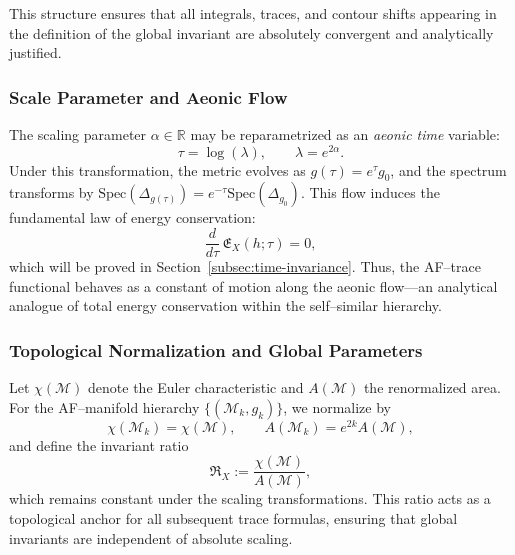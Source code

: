 This structure ensures that all integrals, traces, and contour shifts
appearing in the definition of the global invariant
are absolutely convergent and analytically justified.


\subsubsection*{Scale Parameter and Aeonic Flow}

The scaling parameter \(\alpha \in \mathbb{R}\)
may be reparametrized as an \emph{aeonic time} variable:
\[
\tau = \log(\lambda),
\qquad \lambda = e^{2\alpha}.
\]
Under this transformation,
the metric evolves as \(g(\tau) = e^{\tau}g_0\),
and the spectrum transforms by
\(\mathrm{Spec}(\Delta_{g(\tau)}) = e^{-\tau}\mathrm{Spec}(\Delta_{g_0})\).
This flow induces the fundamental law of energy conservation:
\[
\frac{d}{d\tau}\,\mathfrak{E}_X(h;\tau) = 0,
\]
which will be proved in Section~\ref{subsec:time-invariance}.
Thus, the AF–trace functional behaves as a constant of motion
along the aeonic flow—an analytical analogue of total energy conservation
within the self–similar hierarchy.


\subsubsection*{Topological Normalization and Global Parameters}

Let \(\chi(\mathcal{M})\) denote the Euler characteristic
and \(A(\mathcal{M})\) the renormalized area.
For the AF–manifold hierarchy \(\{(\mathcal{M}_k,g_k)\}\),
we normalize by
\[
\chi(\mathcal{M}_k) = \chi(\mathcal{M}),
\qquad
A(\mathcal{M}_k) = e^{2k} A(\mathcal{M}),
\]
and define the invariant ratio
\[
\mathfrak{R}_X := \frac{\chi(\mathcal{M})}{A(\mathcal{M})},
\]
which remains constant under the scaling transformations.
This ratio acts as a topological anchor
for all subsequent trace formulas,
ensuring that global invariants are independent of absolute scaling.


